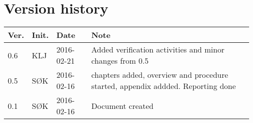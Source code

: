 \chapter*{Version history}
\label{app:rev_his}


\begin{tabular}{b{1cm} b{1cm} b{2cm} b{8cm}}
    \textbf{Ver.} & \textbf{Init.} & \textbf{Date} & \textbf{Note} \\
    \hline
    0.6 & KLJ & 2016-02-21 & Added verification activities and minor changes from 0.5 \\
    0.5 & SØK & 2016-02-16 & chapters added, overview and procedure started, appendix addded. Reporting done \\
    0.1 & SØK & 2016-02-16 & Document created \\
\end{tabular}
